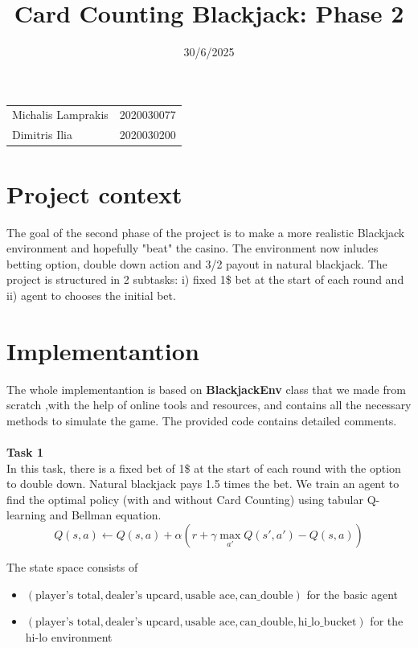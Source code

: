 \documentclass{article}
\title{Card Counting Blackjack: Phase 2}
\date{30/6/2025}
\begin{document}
\maketitle

\noindent\begin{tabular}{@{}ll}
     Michalis Lamprakis & 2020030077\\
     Dimitris Ilia & 2020030200
\end{tabular}

\section*{Project context}

The goal of the second phase of the project is to make a more realistic
Blackjack environment and hopefully "beat" the casino. The environment
now inludes betting option, double down action and 3/2 payout in natural 
blackjack. The project is structured in 2 subtasks: i) fixed 1\$ bet
at the start of each round and ii) agent to chooses the initial bet. 

\section*{Implementantion}
The whole implementantion is based on {\bf BlackjackEnv} class that
we made from scratch ,with the help of online tools and resources,
and contains all the necessary methods to simulate the game.
The provided code contains detailed comments.\\\\
{\bf Task 1}\\
In this task, there is a fixed bet of 1\$ at the start of each round with
the option to double down. Natural blackjack pays 1.5 times the bet.
We train an agent to find the optimal policy (with and without Card Counting) 
using tabular Q-learning
and Bellman equation.
\[
  Q(s, a) \leftarrow Q(s, a) + \alpha \left( r + \gamma \max_{a'} Q(s', a') - Q(s, a) \right)
\]

\noindent The state space consists of 
\begin{itemize}
  \item \((\text{player's total}, \text{dealer's upcard}, \text{usable ace}, \text{can\_double})\) for the basic agent
  \item  \((\text{player's total}, \text{dealer's upcard}, \text{usable ace}, \text{can\_double}, \text{hi\_lo\_bucket})\) for the hi-lo environment
\end{itemize}
\end{document}
